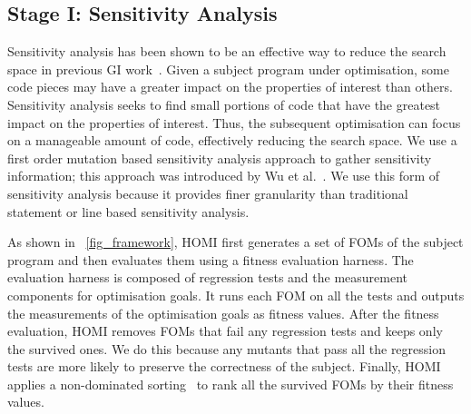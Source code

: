 \documentclass[oribibl]{llncs}
\begin{document}
\vspace{-7mm}

\subsection{Stage I: Sensitivity Analysis}
\label{sec_sensitivity}

Sensitivity analysis has been shown to be an effective way to reduce the search space in previous GI work~\cite{6733370,Bruce:2015:REC:2739480.2754752,6035728}. Given a subject program under optimisation, some code pieces may have a greater impact on the properties of interest than others. Sensitivity analysis seeks to find small portions of code that have the greatest impact on the properties of interest. Thus, the subsequent optimisation  can focus on a manageable amount of code, effectively reducing the search space. We use a first order mutation based sensitivity analysis approach to gather sensitivity information; this approach was introduced by Wu et al.~\cite{Wu:2015:DPO:2739480.2754648}. We use this form of sensitivity analysis because it provides finer granularity than traditional statement or line based sensitivity analysis.  




As shown in \figurename~\ref{fig_framework}, HOMI first generates a set of FOMs of the subject program and then evaluates them using a fitness evaluation harness. The evaluation harness is composed of regression tests and the measurement components for optimisation goals. It runs each FOM on all the tests and outputs the measurements of the optimisation goals as fitness values.  After the fitness evaluation, HOMI removes FOMs that fail any regression tests and keeps only the survived ones. We do this because any mutants that pass all the regression tests are more likely to preserve the correctness of the subject. Finally, HOMI applies a non-dominated sorting~\cite{996017} to rank all the survived FOMs by their fitness values.
 
\end{document}
